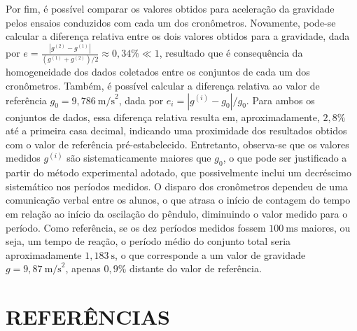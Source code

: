 \documentclass[12pt, a4paper, brazil]{article}
\begin{document}
Por fim, é possível comparar os valores obtidos para aceleração da gravidade pelos ensaios conduzidos com cada um dos cronômetros. Novamente, pode-se calcular a diferença relativa entre os dois valores obtidos para a gravidade, dada por $e =\frac{|g^{(2)}-g^{(1)}|}{(g^{(1)}+g^{(2)})/2}\approx 0,34\%\ll 1$, resultado que é consequência da homogeneidade dos dados coletados entre os conjuntos de cada um dos cronômetros. Também, é possível calcular a diferença relativa ao valor de referência $g_0 = 9,786\ \text{m/s}^2$, dada por $e_i = |g^{(i)}-g_0|/g_0$. Para ambos os conjuntos de dados, essa diferença relativa resulta em, aproximadamente, $2,8\%$ até a primeira casa decimal, indicando uma proximidade dos resultados obtidos com o valor de referência pré-estabelecido. Entretanto, observa-se que os valores medidos $g^{(i)}$ são sistematicamente maiores que $g_0$, o que pode ser justificado a partir do método experimental adotado, que possivelmente inclui um decréscimo sistemático nos períodos medidos. O disparo dos cronômetros dependeu de uma comunicação verbal entre os alunos, o que atrasa o início de contagem do tempo em relação ao início da oscilação do pêndulo, diminuindo o valor medido para o período. Como referência, se os dez períodos medidos fossem $100\ \text{ms}$ maiores, ou seja, um tempo de reação, o período médio do conjunto total seria aproximadamente $1,183\ \text{s}$, o que corresponde a um valor de gravidade $g=9,87\ \text{m/s}^2$, apenas $0,9\%$ distante do valor de referência.


\newpage

\clearpage
\renewcommand{\refname}{}
\section{REFERÊNCIAS}
\vspace{-1.5\baselineskip}

\end{document}
